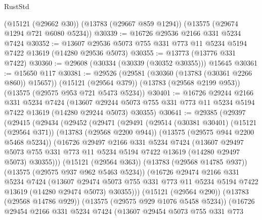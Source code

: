 \begin{lexlean}{RustStd}
\begin{coremodule}
    (@15121 (@29662 @30))
    (@13783 (@29667 @859 @1294))
    (@13575 (@29674 @1294 @721 @6080 @5234))
@30339 := @16726 @29536 @2166 @331 @5234 @7424
@30352 := @13607 @29536 @5073 @755 @331 @773 @11 @5234 @5194 @7422 @13619 (@14280 @29536 @5073)
@30355 := @13773 (@13776 @331 @7422)
@30360 := @29608 (@30334 (@30339 (@30352 @30355))) @15645
@30361 := @15650 @117
@30381 := @29526
    (@29581 (@30360 (@13783 (@30361 @2266 @860)) @15657))
    (@15121 (@29564 @379))
    (@13783 (@29568 @2199 @953))
    (@13575 (@29575 @953 @721 @5473 @5234))
@30401 := @16726
    @29244
    @2166
    @331
    @5234
    @7424
    (@13607 @29244 @5073 @755 @331 @773 @11 @5234 @5194 @7422 @13619 (@14280 @29244 @5073) @30355)
@30641 := @29385
    (@29397
      (@29415
        (@29434
          (@29452
            (@29471
              (@29491
                (@29514
                  (@30381 @30401)
                  (@15121 (@29564 @371))
                  (@13783 (@29568 @2200 @944))
                  (@13575 (@29575 @944 @2200 @5468 @5234))
                  (@16726
                    @29497
                    @2166
                    @331
                    @5234
                    @7424
                    (@13607
                      @29497
                      @5073
                      @755
                      @331
                      @773
                      @11
                      @5234
                      @5194
                      @7422
                      @13619
                      (@14280 @29497 @5073)
                      @30355)))
                (@15121 (@29564 @363))
                (@13783 (@29568 @14785 @937))
                (@13575 (@29575 @937 @962 @5463 @5234))
                (@16726
                  @29474
                  @2166
                  @331
                  @5234
                  @7424
                  (@13607
                    @29474
                    @5073
                    @755
                    @331
                    @773
                    @11
                    @5234
                    @5194
                    @7422
                    @13619
                    (@14280 @29474 @5073)
                    @30355)))
              (@15121 (@29564 @290))
              (@13783 (@29568 @14786 @929))
              (@13575 (@29575 @929 @1076 @5458 @5234))
              (@16726
                @29454
                @2166
                @331
                @5234
                @7424
                (@13607
                  @29454
                  @5073
                  @755
                  @331
                  @773

\end{coremodule}
\end{lexlean}
